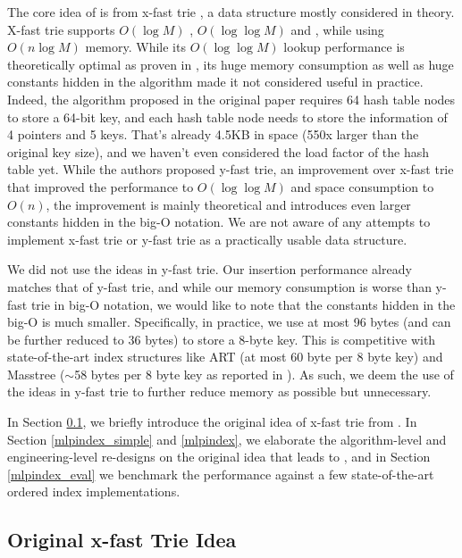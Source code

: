 \documentclass[11pt, usletter]{article}
\begin{document}
The core idea of \MlpIndex is from x-fast trie \cite{xfast}, a data structure mostly considered in theory.
X-fast trie supports $O(\log M)$ \insertion, $O(\log\log M)$ \lookup and \lowerbound, while using $O(n\log M)$ memory.
While its $O(\log\log M)$ lookup performance is theoretically optimal as proven in \cite{ajtai88comb-lowerbound},
its huge memory consumption as well as huge constants hidden in the algorithm made it not considered useful in practice. 
Indeed, the algorithm proposed in the original paper requires 64 hash table nodes to store a 64-bit key, 
and each hash table node needs to store the information of 4 pointers and 5 keys. 
That's already 4.5KB in space (550x larger than the original key size), 
and we haven't even considered the load factor of the hash table yet. 
While the authors proposed y-fast trie, 
an improvement over x-fast trie that improved the \insertion performance to $O(\log\log M)$ and space consumption to $O(n)$, 
the improvement is mainly theoretical and introduces even larger constants hidden in the big-O notation. 
We are not aware of any attempts to implement x-fast trie or y-fast trie as a practically usable data structure. 

We did not use the ideas in y-fast trie. Our insertion performance already matches that of y-fast trie, 
and while our memory consumption is worse than y-fast trie in big-O notation, 
we would like to note that the constants hidden in the big-O is much smaller.
Specifically, in practice, we use at most 96 bytes (and can be further reduced to 36 bytes) to store a 8-byte key. 
This is competitive with state-of-the-art index structures like ART \cite{arttrie_icde13} (at most 60 byte per 8 byte key) 
and Masstree \cite{masstree} ($\sim$58 bytes per 8 byte key as reported in \cite{hot_sigmod18}).
As such, we deem the use of the ideas in y-fast trie to further reduce memory as possible but unnecessary.

In Section \ref{intro_xfast}, we briefly introduce the original idea of x-fast trie from \cite{xfast}. 
In Section \ref{mlpindex_simple} and \ref{mlpindex}, 
we elaborate the algorithm-level and engineering-level re-designs on the original idea that leads to \MlpIndex, 
and in Section \ref{mlpindex_eval} we benchmark the performance against a few state-of-the-art ordered index implementations. 

\subsection{Original x-fast Trie Idea} \label{intro_xfast}
\end{document}
